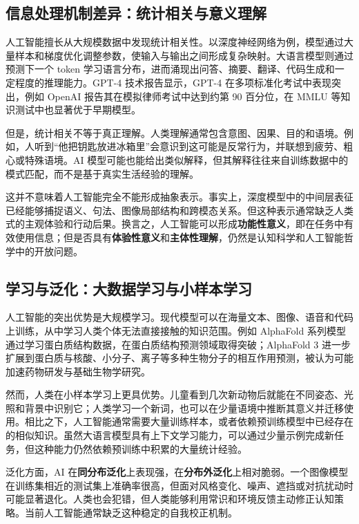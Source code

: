 \documentclass[UTF8,zihao=-4,a4paper]{ctexart}
\begin{document}
\subsection{信息处理机制差异：统计相关与意义理解}

人工智能擅长从大规模数据中发现统计相关性。以深度神经网络为例，模型通过大量样本和梯度优化调整参数，使输入与输出之间形成复杂映射。大语言模型则通过预测下一个 token 学习语言分布，进而涌现出问答、摘要、翻译、代码生成和一定程度的推理能力。GPT-4 技术报告显示，GPT-4 在多项标准化考试中表现突出，例如 OpenAI 报告其在模拟律师考试中达到约第 90 百分位，在 MMLU 等知识测试中也显著优于早期模型\cite{openai2023gpt4}。

但是，统计相关不等于真正理解。人类理解通常包含意图、因果、目的和语境。例如，人听到“他把钥匙放进冰箱里”会意识到这可能是反常行为，并联想到疲劳、粗心或特殊语境。AI 模型可能也能给出类似解释，但其解释往往来自训练数据中的模式匹配，而不是基于真实生活经验的理解。

这并不意味着人工智能完全不能形成抽象表示。事实上，深度模型中的中间层表征已经能够捕捉语义、句法、图像局部结构和跨模态关系。但这种表示通常缺乏人类式的主观体验和行动后果。换言之，人工智能可以形成\textbf{功能性意义}，即在任务中有效使用信息；但是否具有\textbf{体验性意义}和\textbf{主体性理解}，仍然是认知科学和人工智能哲学中的开放问题。

\subsection{学习与泛化：大数据学习与小样本学习}

人工智能的突出优势是大规模学习。现代模型可以在海量文本、图像、语音和代码上训练，从中学习人类个体无法直接接触的知识范围。例如 AlphaFold 系列模型通过学习蛋白质结构数据，在蛋白质结构预测领域取得突破；AlphaFold 3 进一步扩展到蛋白质与核酸、小分子、离子等多种生物分子的相互作用预测，被认为可能加速药物研发与基础生物学研究\cite{alphafold2024nature,guardian2024alphafold}。

然而，人类在小样本学习上更具优势。儿童看到几次新动物后就能在不同姿态、光照和背景中识别它；人类学习一个新词，也可以在少量语境中推断其意义并迁移使用。相比之下，人工智能通常需要大量训练样本，或者依赖预训练模型中已经存在的相似知识。虽然大语言模型具有上下文学习能力，可以通过少量示例完成新任务，但这种能力仍然依赖预训练中积累的大量统计经验。

泛化方面，AI 在\textbf{同分布泛化}上表现强，在\textbf{分布外泛化}上相对脆弱。一个图像模型在训练集相近的测试集上准确率很高，但面对风格变化、噪声、遮挡或对抗扰动时可能显著退化。人类也会犯错，但人类能够利用常识和环境反馈主动修正认知策略。当前人工智能通常缺乏这种稳定的自我校正机制。
\end{document}
